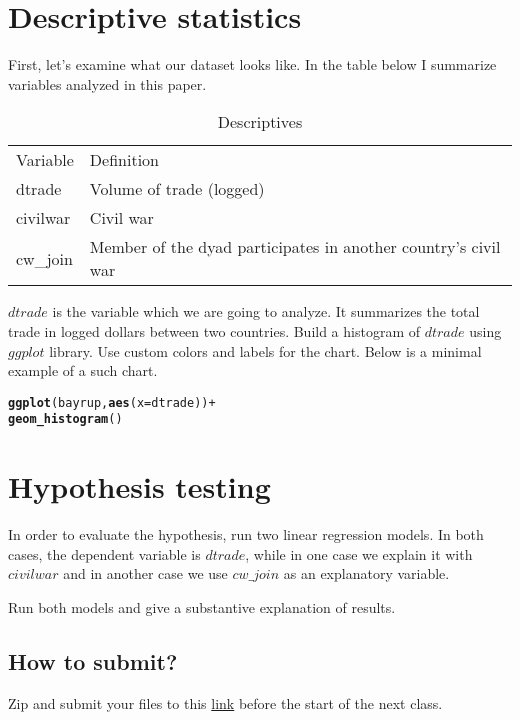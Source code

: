 \documentclass{article}\usepackage[]{graphicx}\usepackage[]{color}
\makeatletter
\newcommand{\hlopt}[1]{\textcolor[rgb]{0,0,0}{#1}}%
\newcommand{\hlstd}[1]{\textcolor[rgb]{0.345,0.345,0.345}{#1}}%
\newcommand{\hlkwc}[1]{\textcolor[rgb]{0.333,0.667,0.333}{#1}}%
\newcommand{\hlkwd}[1]{\textcolor[rgb]{0.737,0.353,0.396}{\textbf{#1}}}%
\newenvironment{kframe}{%
 \def\at@end@of@kframe{}%
 \ifinner\ifhmode%
  \def\at@end@of@kframe{\end{minipage}}%
  \begin{minipage}{\columnwidth}%
 \fi\fi%
 \def\FrameCommand##1{\hskip\@totalleftmargin \hskip-\fboxsep
 \colorbox{shadecolor}{##1}\hskip-\fboxsep
     \hskip-\linewidth \hskip-\@totalleftmargin \hskip\columnwidth}%
 \MakeFramed {\advance\hsize-\width
   \@totalleftmargin\z@ \linewidth\hsize
   \@setminipage}}%
 {\par\unskip\endMakeFramed%
 \at@end@of@kframe}
\newenvironment{knitrout}{}{} %
\makeatother
\begin{document}
\section*{Descriptive statistics}

First, let's examine what our dataset looks like. In the table below I summarize variables analyzed in this paper. 

\begin{table}[]
\centering
\caption{Descriptives}
\label{my-label}
\begin{tabular}{ll}
Variable    & Definition                                                                      \\
dtrade       & Volume of trade (logged)                                               \\
civilwar    & Civil war                             \\
cw\_join    & Member of the dyad participates in another country's civil war 
\end{tabular}
\end{table}


$dtrade$ is the variable which we are going to analyze. It summarizes the total trade in logged dollars between two countries. Build a histogram of $dtrade$ using $ggplot$ library. Use custom colors and labels for the chart. Below is a minimal example of a such chart.

\begin{knitrout}
\color{fgcolor}\begin{kframe}
\begin{alltt}
\hlkwd{ggplot}\hlstd{(bayrup,} \hlkwd{aes}\hlstd{(}\hlkwc{x}\hlstd{=dtrade))}\hlopt{+}
  \hlkwd{geom_histogram}\hlstd{()}
\end{alltt}
\end{kframe}
\end{knitrout}

\section*{Hypothesis testing}

In order to evaluate the hypothesis, run two linear regression models. In both cases, the dependent variable is $dtrade$, while in one case we explain it with $civilwar$ and in another case we use  $cw\_join$ as an explanatory variable.

Run both models and give a substantive explanation of results. 


\subsection*{How to submit?}

Zip and submit your files to this \href{https://www.dropbox.com/request/HQu4rlcjMgLFhNVbPfO3}{link} before the start of the next class.
\end{document}
